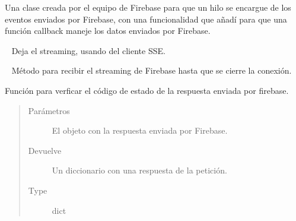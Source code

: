 
\begin{fulllineitems}
\label{\detokenize{nao_firebase:firebase.RemoteThread}}
Una clase creada por el equipo de Firebase para que un hilo
se encargue de los eventos enviados por Firebase, con una
funcionalidad que añadí para que una función callback maneje
los datos enviados por Firebase.

\begin{fulllineitems}
\label{\detokenize{nao_firebase:firebase.RemoteThread.close}}~
Deja el streaming, usando {\hyperref[\detokenize{nao_firebase:firebase.RemoteThread.close}]{}} del cliente SSE.

\end{fulllineitems}


\begin{fulllineitems}
\label{\detokenize{nao_firebase:firebase.RemoteThread.run}}~
Método para recibir el streaming de Firebase hasta que se cierre la
conexión.

\end{fulllineitems}


\end{fulllineitems}


\begin{fulllineitems}
\label{\detokenize{nao_firebase:firebase.check_response}}
Función para verficar el código de estado de la respuesta enviada
por firebase.
\begin{quote}\begin{description}
\item[{Parámetros}] \leavevmode
{} \textendash{} El objeto con la respuesta enviada por Firebase.

\item[{Devuelve}] \leavevmode
Un diccionario con una respuesta de la petición.

\item[{Type}] \leavevmode
dict

\end{description}\end{quote}

\end{fulllineitems}



